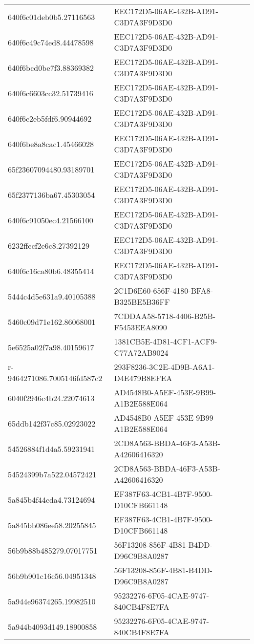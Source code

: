 \begin{tabular}{ll}
640f6c01deb0b5.27116563 & EEC172D5-06AE-432B-AD91-C3D7A3F9D3D0 \\
640f6c49c74ed8.44478598 & EEC172D5-06AE-432B-AD91-C3D7A3F9D3D0 \\
640f6bcd0be7f3.88369382 & EEC172D5-06AE-432B-AD91-C3D7A3F9D3D0 \\
640f6c6603cc32.51739416 & EEC172D5-06AE-432B-AD91-C3D7A3F9D3D0 \\
640f6c2eb5fdf6.90944692 & EEC172D5-06AE-432B-AD91-C3D7A3F9D3D0 \\
640f6be8a8cac1.45466028 & EEC172D5-06AE-432B-AD91-C3D7A3F9D3D0 \\
65f23607094480.93189701 & EEC172D5-06AE-432B-AD91-C3D7A3F9D3D0 \\
65f2377136ba67.45303054 & EEC172D5-06AE-432B-AD91-C3D7A3F9D3D0 \\
640f6c91050ec4.21566100 & EEC172D5-06AE-432B-AD91-C3D7A3F9D3D0 \\
6232ffccf2e6c8.27392129 & EEC172D5-06AE-432B-AD91-C3D7A3F9D3D0 \\
640f6c16ca80b6.48355414 & EEC172D5-06AE-432B-AD91-C3D7A3F9D3D0 \\
5444c4d5e631a9.40105388 & 2C1D6E60-656F-4180-BFA8-B325BE5B36FF \\
5460c09d71e162.86068001 & 7CDDAA58-5718-4406-B25B-F5453EEA8090 \\
5e6525a02f7a98.40159617 & 1381CB5E-4D81-4CF1-ACF9-C77A72AB9024 \\
r-9464271086.7005146fd587c2 & 293F8236-3C2E-4D9B-A6A1-D4E479B8EFEA \\
6040f2946c4b24.22074613 & AD4548B0-A5EF-453E-9B99-A1B2E588E064 \\
65ddb142f37c85.02923022 & AD4548B0-A5EF-453E-9B99-A1B2E588E064 \\
54526884f1d4a5.59231941 & 2CD8A563-BBDA-46F3-A53B-A42606416320 \\
54524399b7a522.04572421 & 2CD8A563-BBDA-46F3-A53B-A42606416320 \\
5a845b4f44cda4.73124694 & EF387F63-4CB1-4B7F-9500-D10CFB661148 \\
5a845bb086ee58.20255845 & EF387F63-4CB1-4B7F-9500-D10CFB661148 \\
56b9b88b485279.07017751 & 56F13208-856F-4B81-B4DD-D96C9B8A0287 \\
56b9b901c16c56.04951348 & 56F13208-856F-4B81-B4DD-D96C9B8A0287 \\
5a944e96374265.19982510 & 95232276-6F05-4CAE-9747-840CB4F8E7FA \\
5a944b4093d149.18900858 & 95232276-6F05-4CAE-9747-840CB4F8E7FA \\

\end{tabular}
